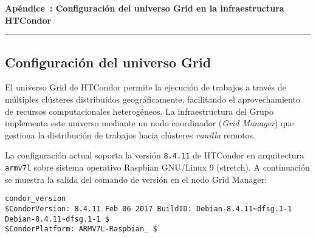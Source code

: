 
{}


\vspace{40pt}

{\centering \normalfont\huge\bfseries Apéndice~\thechapter: Configuración del universo Grid en la infraestructura HTCondor~\par}

\vspace{10pt}

{\centering \rule{\textwidth}{0.4pt} \par}

\vspace{40pt}


\FloatBarrier\subsection{Configuración del universo Grid}

El universo Grid de HTCondor permite la ejecución de trabajos a través de múltiples clústeres distribuidos geográficamente, facilitando el aprovechamiento de recursos computacionales heterogéneos. La infraestructura del Grupo \GRID implementa este universo mediante un nodo coordinador (\textit{Grid Manager}) que gestiona la distribución de trabajos hacia clústeres \textit{vanilla} remotos.

La configuración actual soporta la versión \texttt{8.4.11} de HTCondor en arquitectura \texttt{armv7l} sobre sistema operativo Raspbian GNU/Linux 9 (stretch). A continuación se muestra la salida del comando de versión en el nodo Grid Manager:

\begin{verbatim}
condor_version
$CondorVersion: 8.4.11 Feb 06 2017 BuildID: Debian-8.4.11~dfsg.1-1 Debian-8.4.11~dfsg.1-1 $
$CondorPlatform: ARMV7L-Raspbian_ $
\end{verbatim}


